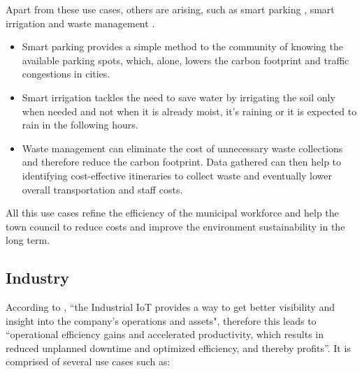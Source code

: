 Apart from these use cases, others are arising, such as smart parking \parencite{GOAP201841}, smart irrigation \parencite{7562735} and waste management \parencite{7972276}.
\begin{itemize}
    \item Smart parking provides a simple method to the community of knowing the available parking spots, which, alone, lowers the carbon footprint and traffic congestions in cities.

    \item Smart irrigation tackles the need to save water by irrigating the soil only when needed and not when it is already moist, it's raining or it is expected to rain in the following hours.

    \item Waste management can eliminate the cost of unnecessary waste collections and therefore reduce the carbon footprint. Data gathered can then help to identifying cost-effective itineraries to collect waste and eventually lower overall transportation and staff costs.
\end{itemize}

All this use cases refine the efficiency of the municipal workforce and help the town council to reduce costs and improve the environment sustainability in the long term.

\subsection{Industry}
\label{subsec:stateofart:areas:industry}

According to \cite{iiot}, ``the Industrial \gls{IoT} provides a way to get better visibility and insight into the company's operations and assets", therefore this leads to ``operational efficiency gains and accelerated productivity, which results in reduced unplanned downtime and optimized efficiency, and thereby profits''.
It is comprised of several use cases \parencite{iiot-cases} such as:

